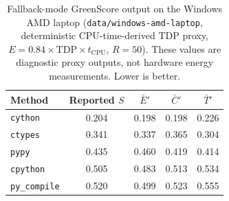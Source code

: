 \begin{table}[t]
\centering
\caption{Fallback-mode GreenScore output on the Windows AMD laptop (\texttt{data/windows-amd-laptop}, deterministic CPU-time-derived TDP proxy, $E=0.84\times\mathrm{TDP}\times t_{\mathrm{CPU}}$, $R{=}50$). These values are diagnostic proxy outputs, not hardware energy measurements. Lower is better.}
\label{tab:greenscore_windows}
\begin{tabular}{lcccc}
\toprule
\textbf{Method} & \textbf{Reported $S$} & $\bar{E}'$ & $\bar{C}'$ & $\bar{T}'$ \\
\midrule
\texttt{cython}      & 0.204 & 0.198 & 0.198 & 0.226 \\
\texttt{ctypes}      & 0.341 & 0.337 & 0.365 & 0.304 \\
\texttt{pypy}        & 0.435 & 0.460 & 0.419 & 0.414 \\
\texttt{cpython}     & 0.505 & 0.483 & 0.513 & 0.534 \\
\texttt{py\_compile} & 0.520 & 0.499 & 0.523 & 0.555 \\
\bottomrule
\end{tabular}
\end{table}
